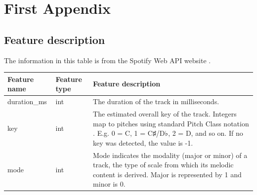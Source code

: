\appendix
\chapter{First Appendix}
\section{Feature description}
The information in this table is from the Spotify Web API website \cite{SpotifyFeatures:online}.

\begin{longtable}{|p{3cm}|p{1.6cm}|p{7cm}|}
\hline
\textbf{Feature name}     & \textbf{Feature type} & \textbf{Feature description}                                                                                                                                                                                                                                                                                                                                                                                                                                                                                                \\ \hline \hline
\endhead
duration\_ms     & int          & The duration of the track in milliseconds.                                                                                                                                                                                                                                                                                                                                                                                                                                                                         \\ \hline
key              & int          & The estimated overall key of the track. Integers map to pitches using standard Pitch Class notation . E.g. 0 = C, 1 = C♯/D♭, 2 = D, and so on. If no key was detected, the value is -1.                                                                                                                                                                                                                                                                                                                            \\ \hline
mode             & int          & Mode indicates the modality (major or minor) of a track, the type of scale from which its melodic content is derived. Major is represented by 1 and minor is 0.                                                                                                                                                                                                                                                                                                                                                    \\ \hline

\end{longtable}
